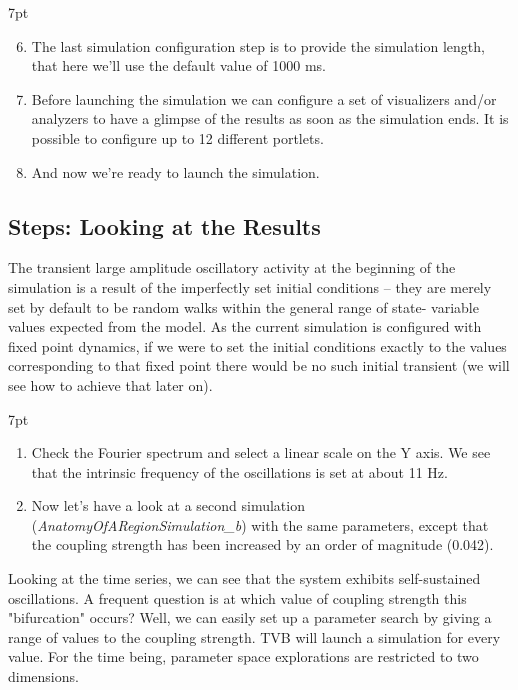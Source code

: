 \documentclass{tufte-handout}
\newenvironment{formal}{%
  \def\FrameCommand{%
    \hspace{1pt}%
    {\color{DarkBlue}\vrule width 2pt}%
    {\color{formalshade}\vrule width 4pt}%
    \colorbox{formalshade}%
  }%
  \MakeFramed{\advance\hsize-\width\FrameRestore}%
  \noindent\hspace{-4.55pt}%
  \begin{adjustwidth}{}{7pt}%
  \vspace{2pt}\vspace{2pt}%
}
{%
  \vspace{2pt}\end{adjustwidth}\endMakeFramed%
}
\newenvironment{simulation}{%
  \def\FrameCommand{%
    \hspace{1pt}%
    {\color{ForestGreen}\vrule width 2pt}%
    {\color{simulationshade}\vrule width 4pt}%
    \colorbox{simulationshade}%
  }%
  \MakeFramed{\advance\hsize-\width\FrameRestore}%
  \noindent\hspace{-4.55pt}%
  \begin{adjustwidth}{}{7pt}%
  \vspace{2pt}\vspace{2pt}%
}
{%
  \vspace{2pt}\end{adjustwidth}\endMakeFramed%
}
\begin{document}
\begin{simulation}
\begin{enumerate}[resume]
  \setcounter{enumi}{5}
 \item The last simulation configuration step is to provide the simulation length, that here we'll use the default value of 1000 ms.
 \item Before launching the simulation we can configure a set of visualizers and/or analyzers to have a glimpse of the results as soon as the simulation ends. It is possible to configure up to 12 different portlets. 
 \item And now we're ready to launch the simulation. 
\end{enumerate}
\end{simulation}


\subsection{Steps: Looking at the Results}\label{sec:steps}


The transient large amplitude oscillatory activity at the beginning of the
simulation is a result of the imperfectly set initial conditions -- they are
merely set by default to be random walks within the general range of state-
variable values expected from the model. As the current simulation is
configured with fixed point dynamics, if we were to set the initial conditions
exactly to the values corresponding to that fixed point there would be no such
initial transient (we will see how to achieve that later on).

\begin{formal}
\begin{enumerate}
\item Check the Fourier spectrum and select a linear scale on the Y axis. 
We see that the intrinsic frequency of the oscillations is set at about 11 Hz. 
\item Now let's have a look at a second simulation (\textit{AnatomyOfARegionSimulation\_b}) with the same parameters, except that the coupling strength has been increased by an order of magnitude (0.042). 
\end{enumerate}
\end{formal}

Looking at the time series, we can see that the system exhibits self-sustained
oscillations. A frequent question is at which value of coupling strength this
"bifurcation" occurs? Well, we can easily set up a parameter search by giving a
range of values to the coupling strength. TVB will launch a simulation for
every value. For the time being, parameter space explorations are restricted to
two dimensions.
\end{document}
